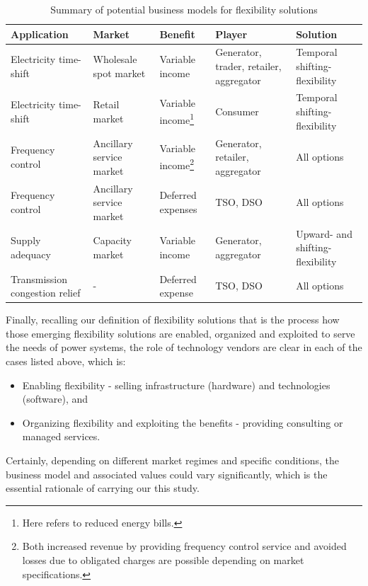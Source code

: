 \begin{table}[h!]
	\centering
	\begin{tabular}{L{2.5cm} L{2.5cm} L{2.5cm} L{2.5cm} L{3cm} }
		\hline
		\hline
		Application & Market & Benefit & Player & Solution \\
		\hline
		\hline
		Electricity time-shift & Wholesale spot market & Variable income & Generator, trader, retailer, aggregator & Temporal shifting-flexibility \\
		\hline
		Electricity time-shift & Retail market & Variable income\footnote{Here refers to reduced energy bills.} & Consumer & Temporal shifting-flexibility \\
		\hline
		Frequency control & Ancillary service market & Variable income\footnote{Both increased revenue by providing frequency control service and avoided losses due to obligated charges are possible depending on market specifications.} & Generator, retailer, aggregator & All options \\
		\hline
		Frequency control & Ancillary service market & Deferred expenses & TSO, DSO & All options \\
		\hline
		Supply adequacy & Capacity market & Variable income & Generator, aggregator & Upward- and shifting- flexibility\\
		\hline
		Transmission congestion relief & - & Deferred expense & TSO, DSO & All options \\
		\hline
		\hline
	\end{tabular}
\caption{Summary of potential business models for flexibility solutions}\label{tab:summary-biz-model}
\end{table}

Finally, recalling our definition of flexibility solutions that is the process how those emerging flexibility solutions are enabled, organized and exploited to serve the needs of power systems, the role of technology vendors are clear in each of the cases listed above, which is:

\begin{itemize}
	\item Enabling flexibility - selling infrastructure (hardware) and technologies (software), and 
	\item Organizing flexibility and exploiting the benefits - providing consulting or managed services.
\end{itemize}

Certainly, depending on different market regimes and specific conditions, the business model and associated values could vary significantly, which is the essential rationale of carrying our this study.

